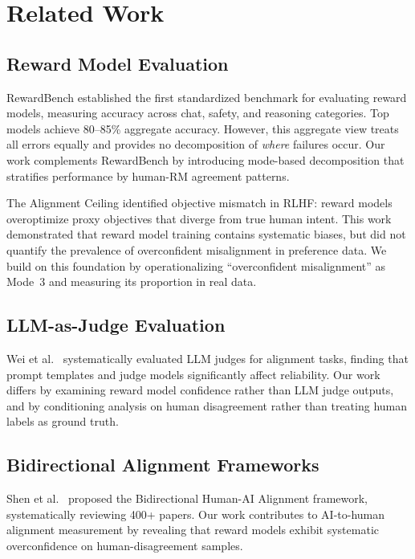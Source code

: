 \section{Related Work}

\subsection{Reward Model Evaluation}

RewardBench \cite{lambert2024rewardbench} established the first standardized benchmark for evaluating reward models, measuring accuracy across chat, safety, and reasoning categories. Top models achieve 80--85\% aggregate accuracy. However, this aggregate view treats all errors equally and provides no decomposition of \emph{where} failures occur. Our work complements RewardBench by introducing mode-based decomposition that stratifies performance by human-RM agreement patterns.

The Alignment Ceiling \cite{lambert2023alignmentceiling} identified objective mismatch in RLHF: reward models overoptimize proxy objectives that diverge from true human intent. This work demonstrated that reward model training contains systematic biases, but did not quantify the prevalence of overconfident misalignment in preference data. We build on this foundation by operationalizing ``overconfident misalignment'' as Mode~3 and measuring its proportion in real data.

\subsection{LLM-as-Judge Evaluation}

Wei et al.~\cite{wei2024llmasjudge} systematically evaluated LLM judges for alignment tasks, finding that prompt templates and judge models significantly affect reliability. Our work differs by examining reward model confidence rather than LLM judge outputs, and by conditioning analysis on human disagreement rather than treating human labels as ground truth.

\subsection{Bidirectional Alignment Frameworks}

Shen et al.~\cite{shen2024bidirectional} proposed the Bidirectional Human-AI Alignment framework, systematically reviewing 400+ papers. Our work contributes to AI-to-human alignment measurement by revealing that reward models exhibit systematic overconfidence on human-disagreement samples.
